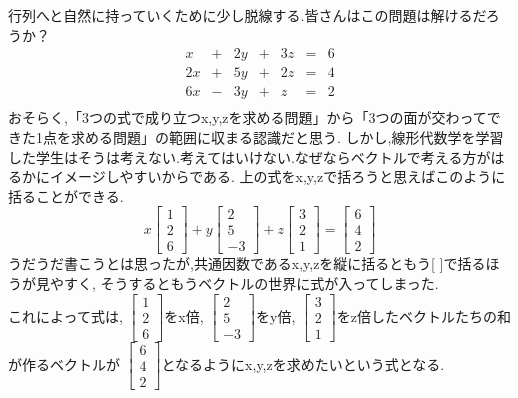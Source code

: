 行列へと自然に持っていくために少し脱線する.皆さんはこの問題は解けるだろうか？
\[
\begin{array}{*{7}{c}}
    x & + &2y & +&3z &= &6 \\
   2x & +&5y & +&2z &= &4 \\
   6x & - &3y & +&z &= &2 \\
\end{array}
\]
おそらく,「3つの式で成り立つx,y,zを求める問題」から「3つの面が交わってできた1点を求める問題」の範囲に収まる認識だと思う.
しかし,線形代数学を学習した学生はそうは考えない.考えてはいけない.なぜならベクトルで考える方がはるかにイメージしやすいからである.
上の式をx,y,zで括ろうと思えばこのように括ることができる.\\
\begin{equation}\label{eq:linear_comb}
x
\begin{bmatrix} 1 \\ 2 \\ 6 \end{bmatrix}
+y
\begin{bmatrix} 2 \\ 5 \\ -3 \end{bmatrix}
+z
\begin{bmatrix} 3 \\ 2 \\ 1 \end{bmatrix}
=
\begin{bmatrix} 6 \\ 4 \\ 2 \end{bmatrix}
\end{equation}
うだうだ書こうとは思ったが,共通因数であるx,y,zを縦に括るともう[ \quad ]で括るほうが見やすく,
そうするともうベクトルの世界に式が入ってしまった.\\
これによって式は,
$\begin{bmatrix} 1 \\ 2 \\ 6 \end{bmatrix}$をx倍,
$\begin{bmatrix} 2 \\ 5 \\ -3 \end{bmatrix}$をy倍,
$\begin{bmatrix} 3 \\ 2 \\ 1 \end{bmatrix}$をz倍したベクトルたちの和が作るベクトルが
$\begin{bmatrix} 6 \\ 4 \\ 2 \end{bmatrix}$となるようにx,y,zを求めたいという式となる.
